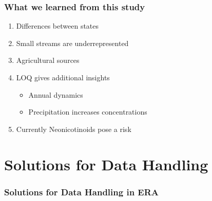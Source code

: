\documentclass[
	12pt
	]{beamer}
\begin{document}
\begin{frame}
\frametitle{What we learned from this study}
	\begin{enumerate}
		\item Differences between \alert{states}
		\item Small streams are \alert{underrepresented}
		\item \alert{Agricultural} sources
		\item \alert{LOQ} gives additional insights
			\begin{itemize}
				\item Annual \alert{dynamics}
				\item \alert{Precipitation} increases concentrations
			\end{itemize}
		\item Currently \alert{Neonicotinoids} pose a risk
	\end{enumerate}
\end{frame}



\section{Solutions for Data Handling}

\begingroup
\footnotesize %
\begin{frame}[noframenumbering]
\frametitle{Solutions for Data Handling in ERA}
    \vspace*{0mm}
	\resizebox{1.02\textwidth}{!}{
		\hspace*{-20mm}
	}
\end{frame}
\endgroup
\end{document}
